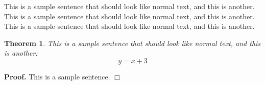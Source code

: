 \documentclass[officiallayout]{tktla}
\newtheorem{theorem}{Theorem}[chapter]
\newenvironment{proof}{\noindent\textbf{Proof.} }{$\Box$}
\begin{document}
This is a sample sentence that should look like normal text, and this
is another. This is a sample sentence that should look like normal
text, and this is another. This is a sample sentence that should look
like normal text, and this is another.


\begin{theorem}
This is a sample sentence that should look like normal text,
and this is another:
\[ y = x+3 \]
\end{theorem}

\begin{proof}
This is a sample sentence.
\end{proof}



\end{document}
